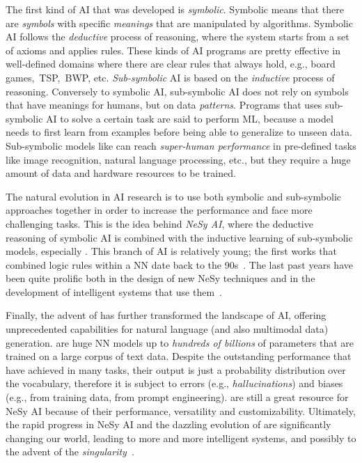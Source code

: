 \begin{refsection}
The first kind of \gls{AI} that was developed is \emph{symbolic}.
%
Symbolic means that there are \emph{symbols} with specific \emph{meanings} that are manipulated by algorithms.
%
Symbolic \gls{AI} follows the \emph{deductive} process of reasoning, where the system starts from a set of axioms and applies rules.
%
These kinds of \gls{AI} programs are pretty effective in well-defined domains where there are clear rules that always hold, e.g., board games,~\gls{TSP},~\gls{BWP}, etc.
%
\emph{Sub-symbolic} \gls{AI} is based on the \emph{inductive} process of reasoning.
%
Conversely to symbolic \gls{AI}, sub-symbolic \gls{AI} does not rely on symbols that have meanings for humans, but on data \emph{patterns}.
%
Programs that uses sub-symbolic \gls{AI} to solve a certain task are said to perform \gls{ML}, because a model needs to first learn from examples before being able to generalize to unseen data.
%
Sub-symbolic models like  can reach \emph{super-human performance} in pre-defined tasks like image recognition, natural language processing, etc., but they require a huge amount of data and hardware resources to be trained.


The natural evolution in \gls{AI} research is to use both symbolic and sub-symbolic approaches together in order to increase the performance and face more challenging tasks.
%
This is the idea behind \emph{\gls{NeSy} \gls{AI}}, where the deductive reasoning of symbolic \gls{AI} is combined with the inductive learning of sub-symbolic models, especially .
%
This branch of \gls{AI} is relatively young; the first works that combined logic rules within a \gls{NN} date back to the 90s~\cite{DBLP:conf/aaai/TowellSN90,DBLP:journals/ai/TowellS94}.
%
The last past years have been quite prolific both in the design of new \gls{NeSy} techniques and in the development of intelligent systems that use them~\cite{DBLP:journals/csur/CiattoSAMO24}.


Finally, the advent of  has further transformed the landscape of \gls{AI}, offering unprecedented capabilities for natural language (and also multimodal data) generation.
%
 are huge \gls{NN} models up to \emph{hundreds of billions} of parameters that are trained on a large corpus of text data.
%
Despite the outstanding performance that  have achieved in many tasks, their output is just a probability distribution over the vocabulary, therefore it is subject to errors (e.g., \emph{hallucinations}) and biases (e.g., from training data, from prompt engineering).
%
 are still a great resource for \gls{NeSy} \gls{AI} because of their performance, versatility and customizability.
%
Ultimately, the rapid progress in \gls{NeSy} \gls{AI} and the dazzling evolution of  are significantly changing our world, leading to more and more intelligent systems, and possibly to the advent of the \emph{singularity}~\cite{shanahan2015technological}.



\end{refsection}
